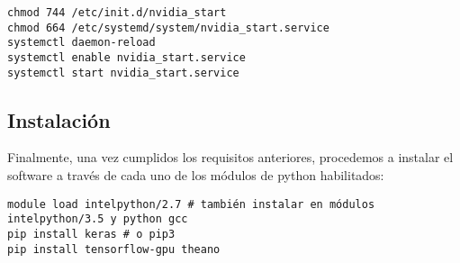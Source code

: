 \begin{lstlisting}
chmod 744 /etc/init.d/nvidia_start
chmod 664 /etc/systemd/system/nvidia_start.service
systemctl daemon-reload
systemctl enable nvidia_start.service
systemctl start nvidia_start.service
\end{lstlisting}

\subsection{Instalación}
Finalmente, una vez cumplidos los requisitos anteriores, procedemos a instalar el software a través de cada uno de los módulos de python habilitados:

\begin{lstlisting}
module load intelpython/2.7 # también instalar en módulos intelpython/3.5 y python gcc
pip install keras # o pip3
pip install tensorflow-gpu theano
\end{lstlisting}

\clearpage